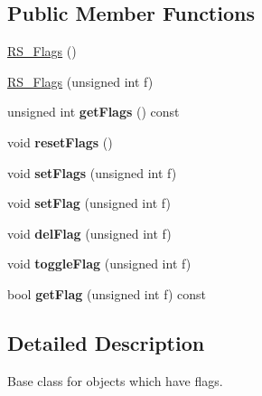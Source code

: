\subsection*{Public Member Functions}
\begin{DoxyCompactItemize}
\item 
\hyperlink{classRS__Flags_af861f02a5edbed5cd68058452178bf04}{R\-S\-\_\-\-Flags} ()
\item 
\hyperlink{classRS__Flags_af07f858ba2091d9e295cc97e965c1043}{R\-S\-\_\-\-Flags} (unsigned int f)
\item 
\hypertarget{classRS__Flags_acd7f6dc8ec453376cc308719271bd469}{unsigned int {\bfseries get\-Flags} () const }\label{classRS__Flags_acd7f6dc8ec453376cc308719271bd469}

\item 
\hypertarget{classRS__Flags_aac8e49396dd71bea8df1481c318eee57}{void {\bfseries reset\-Flags} ()}\label{classRS__Flags_aac8e49396dd71bea8df1481c318eee57}

\item 
\hypertarget{classRS__Flags_a05c57f5c69f2756aefb757fb5504979d}{void {\bfseries set\-Flags} (unsigned int f)}\label{classRS__Flags_a05c57f5c69f2756aefb757fb5504979d}

\item 
\hypertarget{classRS__Flags_a66aa2effd1ca0ec04b3a16f8576ecd94}{void {\bfseries set\-Flag} (unsigned int f)}\label{classRS__Flags_a66aa2effd1ca0ec04b3a16f8576ecd94}

\item 
\hypertarget{classRS__Flags_a19f86d1463edf612c1de67d78f77417d}{void {\bfseries del\-Flag} (unsigned int f)}\label{classRS__Flags_a19f86d1463edf612c1de67d78f77417d}

\item 
\hypertarget{classRS__Flags_ac6df5a739d040a9bdab0cf3477737275}{void {\bfseries toggle\-Flag} (unsigned int f)}\label{classRS__Flags_ac6df5a739d040a9bdab0cf3477737275}

\item 
\hypertarget{classRS__Flags_aa30480dd06a533ee0a384a16f822da30}{bool {\bfseries get\-Flag} (unsigned int f) const }\label{classRS__Flags_aa30480dd06a533ee0a384a16f822da30}

\end{DoxyCompactItemize}


\subsection{Detailed Description}
Base class for objects which have flags.

